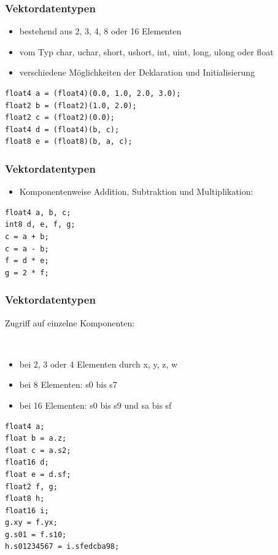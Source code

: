 \documentclass{beamer}
\begin{document}
\begin{frame}[fragile]
\frametitle{Vektordatentypen}
\begin{itemize}
\item bestehend aus 2, 3, 4, 8 oder 16 Elementen
\item vom Typ char, uchar, short, ushort, int, uint, long, ulong oder float
\item verschiedene Möglichkeiten der Deklaration und Initialisierung
\end{itemize}
\begin{lstlisting}
float4 a = (float4)(0.0, 1.0, 2.0, 3.0);
float2 b = (float2)(1.0, 2.0);
float2 c = (float2)(0.0);
float4 d = (float4)(b, c);
float8 e = (float8)(b, a, c);
\end{lstlisting}
\end{frame}

\begin{frame}[fragile]
\frametitle{Vektordatentypen}
\begin{itemize}
\item Komponentenweise Addition, Subtraktion und Multiplikation:
\end{itemize}
\begin{lstlisting}
float4 a, b, c;
int8 d, e, f, g;
c = a + b;
c = a - b;
f = d * e;
g = 2 * f;
\end{lstlisting}
\end{frame}

\begin{frame}[fragile]
\frametitle{Vektordatentypen}
\begin{large}
Zugriff auf einzelne Komponenten:
\end{large}
\\
\begin{itemize}
\item  bei 2, 3 oder 4 Elementen durch x, y, z, w
\item bei 8 Elementen: s0 bis s7
\item bei 16 Elementen: s0 bis s9 und sa bis sf
\end{itemize}
\begin{lstlisting}
float4 a;
float b = a.z;
float c = a.s2;
float16 d;
float e = d.sf;
float2 f, g;
float8 h;
float16 i;
g.xy = f.yx;
g.s01 = f.s10;
h.s01234567 = i.sfedcba98;
\end{lstlisting}
\end{frame}
\end{document}
